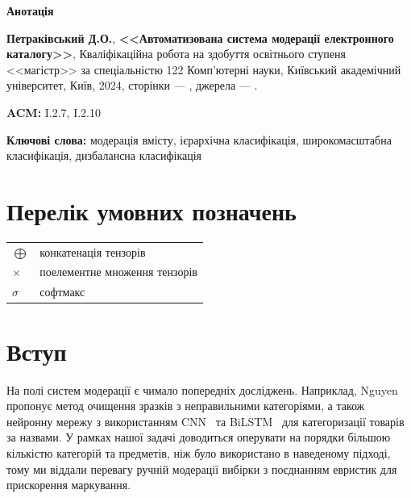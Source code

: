 \documentclass[fleqn,12pt,a4paper]{report}
\numberwithin{equation}{chapter}
\numberwithin{figure}{chapter}
\numberwithin{table}{chapter}
\numberwithin{footnote}{chapter}
\numberwithin{figure}{section}
\begin{document}
    \begin{center}
        \Large \textbf{Анотація}
    \end{center}
    \noindent
    \textbf{Петраківський Д.О.}, \textbf{<<Автоматизована система модерації електронного каталогу>>}, Кваліфікаційна
    робота на здобуття освітнього ступеня <<магістр>> за спеціальністю 122 Комп'ютерні науки, Київський академічний
    університет, Київ, 2024, сторінки --- \ztotpages, джерела --- .

    \bigskip
    \noindent
    \textbf{ACM:} I.2.7, I.2.10

    \bigskip
    \noindent
    \textbf{Ключові слова:} модерація вмісту, ієрархічна класифікація, широкомасштабна класифікація, дизбалансна
    класифікація

    \newpage
    \tableofcontents

    \newpage

    \chapter*{Перелік умовних позначень}\label{ch:conventions}

    \bigskip
    \begin{tabular}{ll}
        $\bigoplus$ & конкатенація тензорів         \\
        $\times$    & поелементне множення тензорів \\
        $\sigma$    & софтмакс
    \end{tabular}

    \newpage

    \listoffigures

    \newpage

    \chapter*{Вступ}\label{ch:introduction}

    На полі систем модерації є чимало попередніх досліджень.
    Наприклад, Nguyen~\cite{Nguyen2022} пропонує метод очищення зразків з неправильними категоріями, а також нейронну
    мережу з використанням CNN~\cite{Lecun1998} та BiLSTM~\cite{Schuster1997} для категоризації товарів за назвами.
    У рамках нашої задачі доводиться оперувати на порядки більшою кількістю категорій та предметів, ніж було
    використано в наведеному підході, тому ми віддали перевагу ручній модерації вибірки з поєднанням евристик для
    прискорення маркування.
\end{document}
